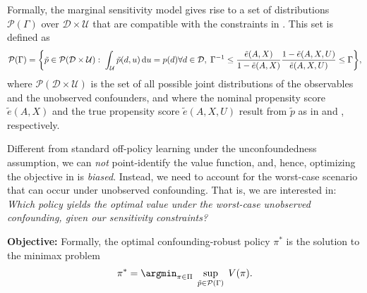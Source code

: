 \documentclass{article} %
\theoremstyle{plain}
\theoremstyle{definition}
\theoremstyle{remark}
\newcommand*\diff{\mathop{}\!\mathrm{d}}
\begin{document}
Formally, the marginal sensitivity model gives rise to a set of distributions $\mathcal{P}(\Gamma)$ over $\mathcal{D} \times \mathcal{U}$ that are compatible with the constraints in . This set is defined as
\begin{equation}
    \mathcal{P}(\Gamma) = \bigg\{ \tilde{p}\in \mathcal{P}(\mathcal{D}\times\mathcal{U}):
    \;\int_\mathcal{U}\tilde{p}(d,u)\diff u = p(d)\\ \forall d\in\mathcal{D},\;
    \Gamma^{-1} \leq \frac{\tilde{e}(A,X)}{1-\tilde{e}(A,X)}\frac{1-\tilde{e}(A,X,U)}{\tilde{e}(A,X,U)}\leq \Gamma \bigg\}, 
    \label{eq:constraints}
\end{equation}
where $\mathcal{P}(\mathcal{D}\times\mathcal{U})$ is the set of all possible joint distributions of the observables and the unobserved confounders, and where the nominal propensity score $\tilde{e}(A,X)$ and the true propensity score $\tilde{e}(A,X,U)$ result from $\tilde{p}$ as in  and , respectively.

Different from standard off-policy learning under the unconfoundedness assumption, we can \emph{not} point-identify the value function, and, hence, optimizing the objective in  is \emph{biased}. Instead, we need to account for the worst-case scenario that can occur under unobserved confounding. That is, we are interested in: \emph{Which policy yields the optimal value under the worst-case unobserved confounding, given our sensitivity constraints?}


\textbf{Objective:} Formally, the optimal confounding-robust policy $\pi^*$ is the solution to the minimax problem
\begin{align}\label{eq:minimax_value}
    \pi^* = \argmin_{\pi \in \Pi} \; \sup_{\tilde{p}\in \mathcal{P}(\Gamma)} \;  V(\pi).
\end{align}
\end{document}
